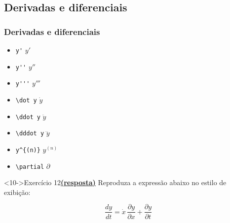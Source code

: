 \documentclass[handout,10pt]{beamer}
\begin{document}
\subsection{Derivadas e diferenciais}
\begin{frame}[fragile]
	\frametitle{Derivadas e diferenciais}
		
	\begin{atividade}{6}
		\begin{itemize}
			\item<2-> \verb|y'|       \hfill \(y'\)
			\item<3-> \verb|y''|      \hfill \(y''\)
			\item<4-> \verb|y'''|     \hfill \(y'''\)
			\item<5-> \verb|\dot y|   \hfill \(\dot y\)
			\item<6-> \verb|\ddot y|  \hfill \(\ddot y\)
			\item<7-> \verb|\dddot y| \hfill \(\dddot y\)
			\item<8-> \verb|y^{(n)}|  \hfill \(y^{(n)}\)
			\item<9-> \verb|\partial| \hfill \(\partial\)
		\end{itemize}
	\end{atividade}
	
	
	\begin{block}<10->{Exercício 12\hyperlink{respostas9-13}{\footnotesize\textbf{(resposta)}}}
		Reproduza a expressão abaixo no estilo de exibição:
	
		\[\frac{dy}{dt} = \dot x \, \frac{\partial y}{\partial x} + \frac{\partial y}{\partial t}\]
	\end{block}
	
\end{frame}
\end{document}
